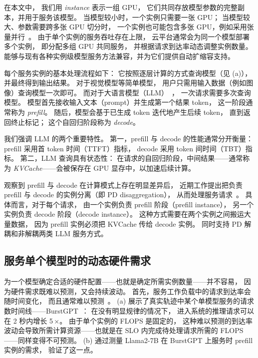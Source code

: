 在本文中，
我们用 \emph{instance} 表示一组 GPU，
它们共同存放模型参数的完整副本，并用于服务该模型。
当模型较小时，一个实例只需要一张 GPU；
当模型较大、参数需要跨多张 GPU 切分时，
一个实例也可能包含多张 GPU，例如采用张量并行~\cite{narayanan2021efficient}。
由于单个实例的服务吞吐存在上限，
云平台通常会为同一个模型部署多个实例，
即分配多组 GPU 共同服务，
并根据请求到达率动态调整实例数量。
{\sys} 能够与现有各种实例级模型服务方法兼容，并为它们提供自动扩缩容支持。

每个服务实例的基本处理流程如下：
它按照逐层计算的方式查询模型（见 {} (a)），
并最终得到输出结果。
对于视觉模型等简单模型，
用户只需用输入数据（例如图像）查询模型一次即可。
而对于大语言模型（LLM）~\cite{DBLP:conf/nips/VaswaniSPUJGKP17}，
一次请求需要多次查询模型。
模型首先接收输入文本（prompt）并生成第一个结果 token，
这一阶段通常称为 \emph{prefill}。
随后，模型会基于已生成 token 迭代地产生后续 token，
直到返回终止标记；
这个自回归阶段称为 \emph{decode}。

我们强调 LLM 的两个重要特性。
第一，prefill 与 decode 的性能通常分开衡量：
prefill 采用首 token 时间（TTFT）指标，
decode 采用 token 间时间（TBT）指标。
第二，LLM 查询具有状态性：
在请求的自回归阶段，中间结果——通常称为 \emph{KVCache}——会被保存在 GPU 显存中，以加速后续计算。

观察到 prefill 与 decode 在计算模式上存在明显差异后，
近期工作提出把负责 prefill 与 decode 的实例分离（即 PD disaggregation），
从而处理服务请求~\cite{DBLP:conf/isca/PatelCZSGMB24, DBLP:conf/osdi/ZhongLCHZL0024,DBLP:journals/corr/abs-2401-11181}。
具体而言，对于每个请求，
由一个实例负责 prefill 阶段（prefill instance），
另一个实例负责 decode 阶段（decode instance）。
这种方式需要在两个实例之间搬运大量数据，
因为 prefill 实例必须把 KVCache 传给 decode 实例。
{\sys} 同时支持 PD 解耦和非解耦两类 LLM 服务方式。

\subsection{服务单个模型时的动态硬件需求}
\label{sec:problem-statement}

\noindent
为一个模型确定合适的硬件配置——也就是确定所需实例数量——并不容易，
因为硬件需求既难以预测，又会持续波动。
首先，服务工作负载中的请求到达率会随时间变化，
而且通常难以预测~\cite{DBLP:journals/corr/abs-2401-14351,DBLP:conf/usenix/ShahradFGCBCLTR20,DBLP:conf/nsdi/0025TKS23}。
{} (a) 展示了真实轨迹中某个单模型服务的请求数时间线——BurstGPT~\cite{wang2024burstgpt}：
在没有明显规律的情况下，
进入系统的推理请求可以在 2 秒内增长 5\,$\times$。
由于单个实例的 FLOPS 是固定的，
这种难以预测的到达率波动会导致所需计算资源——也就是在 SLO 内完成待处理请求所需的 FLOPS——同样变得不可预测。
{} (b) 通过测量 Llama2-7B 在 BurstGPT 上服务时 prefill 实例的需求，
验证了这一点。


